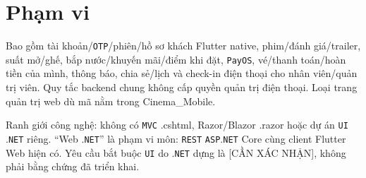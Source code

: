 \clearpage
\section{Phạm vi}\label{sec:srs-3}
Bao gồm tài khoản/\allowbreak{}\texttt{OTP}/\allowbreak{}phiên/\allowbreak{}hồ sơ khách Flutter native, phim/\allowbreak{}đánh giá/\allowbreak{}trailer, suất mở/\allowbreak{}ghế, bắp nước/\allowbreak{}khuyến mãi/\allowbreak{}điểm khi đặt, \texttt{Pay\allowbreak{}OS}, vé/\allowbreak{}thanh toán/\allowbreak{}hoàn tiền của mình, thông báo, chia sẻ/\allowbreak{}lịch và check-in điện thoại cho nhân viên/\allowbreak{}quản trị viên. Quy tắc backend chung không cấp quyền quản trị điện thoại. Loại trang quản trị web dù mã nằm trong Cinema\_Mobile.

Ranh giới công nghệ: không có \texttt{MVC} .cshtml, Razor/\allowbreak{}Blazor .razor hoặc dự án \texttt{UI} .\texttt{NET} riêng. “Web .\texttt{NET}” là phạm vi môn: \texttt{REST} \texttt{ASP}.\texttt{NET} Core cùng client Flutter Web hiện có. Yêu cầu bắt buộc \texttt{UI} do .\texttt{NET} dựng là [CẦN XÁC NHẬN], không phải bằng chứng đã triển khai.
